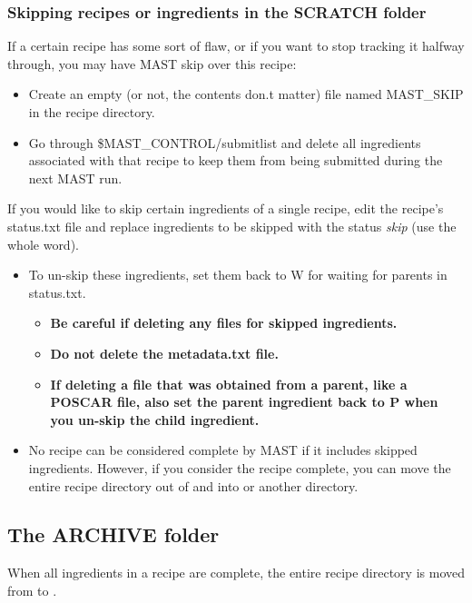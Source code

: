 \documentclass[letterpaper,10pt,english]{sphinxmanual}
\begin{document}
\subsubsection{Skipping recipes or ingredients in the SCRATCH folder}
\label{5_0_runningmast:skipping-recipes-or-ingredients-in-the-scratch-folder}
If a certain recipe has some sort of flaw, or if you want to stop tracking it halfway through, you may have MAST skip over this recipe:
\begin{itemize}
\item {} 
Create an empty (or not, the contents don.t matter) file named MAST\_SKIP in the recipe directory.

\item {} 
Go through \$MAST\_CONTROL/submitlist and delete all ingredients associated with that recipe to keep them from being submitted during the next MAST run.

\end{itemize}

If you would like to skip certain ingredients of a single recipe, edit the recipe's status.txt file and replace ingredients to be skipped with the status \emph{skip} (use the whole word).
\begin{itemize}
\item {} 
To un-skip these ingredients, set them back to W for waiting for parents in status.txt.
\begin{itemize}
\item {} 
\textbf{Be careful if deleting any files for skipped ingredients.}

\item {} 
\textbf{Do not delete the metadata.txt file.}

\item {} 
\textbf{If deleting a file that was obtained from a parent, like a POSCAR file, also set the parent ingredient back to P when you un-skip the child ingredient.}

\end{itemize}

\item {} 
No recipe can be considered complete by MAST if it includes skipped ingredients. However, if you consider the recipe complete, you can move the entire recipe directory out of  and into  or another directory.

\end{itemize}


\subsection{The ARCHIVE folder}
\label{5_0_runningmast:the-archive-folder}
When all ingredients in a recipe are complete, the entire recipe directory is moved from  to .
\end{document}
